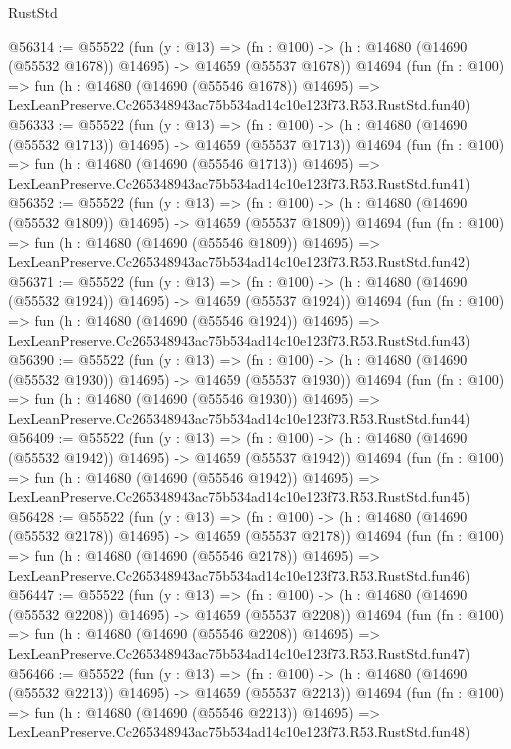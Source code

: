 \begin{lexlean}{RustStd}
\begin{coremodule}
@56314 := @55522
    (fun (y : @13) =>
    (fn : @100) -> (h : @14680 (@14690 (@55532 @1678)) @14695) -> @14659 (@55537 @1678))
    @14694
    (fun (fn : @100) =>
    fun (h : @14680 (@14690 (@55546 @1678)) @14695) =>
    LexLeanPreserve.Cc265348943ac75b534ad14c10e123f73.R53.RustStd.fun40)
@56333 := @55522
    (fun (y : @13) =>
    (fn : @100) -> (h : @14680 (@14690 (@55532 @1713)) @14695) -> @14659 (@55537 @1713))
    @14694
    (fun (fn : @100) =>
    fun (h : @14680 (@14690 (@55546 @1713)) @14695) =>
    LexLeanPreserve.Cc265348943ac75b534ad14c10e123f73.R53.RustStd.fun41)
@56352 := @55522
    (fun (y : @13) =>
    (fn : @100) -> (h : @14680 (@14690 (@55532 @1809)) @14695) -> @14659 (@55537 @1809))
    @14694
    (fun (fn : @100) =>
    fun (h : @14680 (@14690 (@55546 @1809)) @14695) =>
    LexLeanPreserve.Cc265348943ac75b534ad14c10e123f73.R53.RustStd.fun42)
@56371 := @55522
    (fun (y : @13) =>
    (fn : @100) -> (h : @14680 (@14690 (@55532 @1924)) @14695) -> @14659 (@55537 @1924))
    @14694
    (fun (fn : @100) =>
    fun (h : @14680 (@14690 (@55546 @1924)) @14695) =>
    LexLeanPreserve.Cc265348943ac75b534ad14c10e123f73.R53.RustStd.fun43)
@56390 := @55522
    (fun (y : @13) =>
    (fn : @100) -> (h : @14680 (@14690 (@55532 @1930)) @14695) -> @14659 (@55537 @1930))
    @14694
    (fun (fn : @100) =>
    fun (h : @14680 (@14690 (@55546 @1930)) @14695) =>
    LexLeanPreserve.Cc265348943ac75b534ad14c10e123f73.R53.RustStd.fun44)
@56409 := @55522
    (fun (y : @13) =>
    (fn : @100) -> (h : @14680 (@14690 (@55532 @1942)) @14695) -> @14659 (@55537 @1942))
    @14694
    (fun (fn : @100) =>
    fun (h : @14680 (@14690 (@55546 @1942)) @14695) =>
    LexLeanPreserve.Cc265348943ac75b534ad14c10e123f73.R53.RustStd.fun45)
@56428 := @55522
    (fun (y : @13) =>
    (fn : @100) -> (h : @14680 (@14690 (@55532 @2178)) @14695) -> @14659 (@55537 @2178))
    @14694
    (fun (fn : @100) =>
    fun (h : @14680 (@14690 (@55546 @2178)) @14695) =>
    LexLeanPreserve.Cc265348943ac75b534ad14c10e123f73.R53.RustStd.fun46)
@56447 := @55522
    (fun (y : @13) =>
    (fn : @100) -> (h : @14680 (@14690 (@55532 @2208)) @14695) -> @14659 (@55537 @2208))
    @14694
    (fun (fn : @100) =>
    fun (h : @14680 (@14690 (@55546 @2208)) @14695) =>
    LexLeanPreserve.Cc265348943ac75b534ad14c10e123f73.R53.RustStd.fun47)
@56466 := @55522
    (fun (y : @13) =>
    (fn : @100) -> (h : @14680 (@14690 (@55532 @2213)) @14695) -> @14659 (@55537 @2213))
    @14694
    (fun (fn : @100) =>
    fun (h : @14680 (@14690 (@55546 @2213)) @14695) =>
    LexLeanPreserve.Cc265348943ac75b534ad14c10e123f73.R53.RustStd.fun48)

\end{coremodule}
\end{lexlean}

